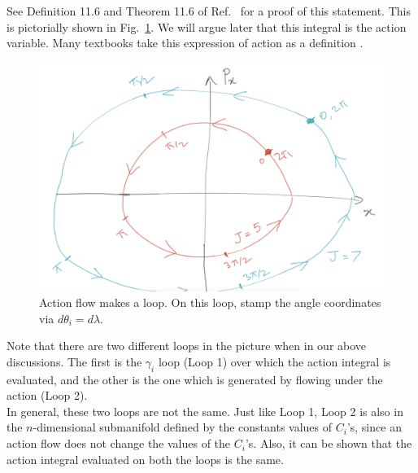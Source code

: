 See Definition 11.6 and Theorem 11.6 of
Ref.~\cite{fasano} for a proof of this statement.
This is pictorially shown in
Fig.~\ref{action_loop}. 
We will argue later that this integral
is the action variable.
Many textbooks take this expression of action as a definition \cite{goldstein2013classical}. \\






\begin{figure}
  \centering
  \includegraphics[width=0.7\linewidth]{action_loop}
  \caption{ Action flow makes a loop. On this loop,
  stamp the angle coordinates via $d \theta_i = d \lambda$.
    \vspace{-1.em}
  }
  \label{action_loop}
\end{figure}





\hfill \break


\begin{definition}[label=def:C1]


Note that there are two different loops in the picture when in our 
above discussions. The first is the $\gamma_i$ loop (Loop 1) over which
the action integral is evaluated, and the other is the one which is generated
by flowing under the action (Loop 2).\\


In general, these two loops are not the same.
Just like Loop 1,
Loop 2 is also in the $n$-dimensional submanifold
defined by the constants values of $C_i$'s, since
an action flow does not change the values of the $C_i$'s.
 Also, it can be shown that the action
integral evaluated on both the loops is the same.
 



\end{definition}

\hfill \break

